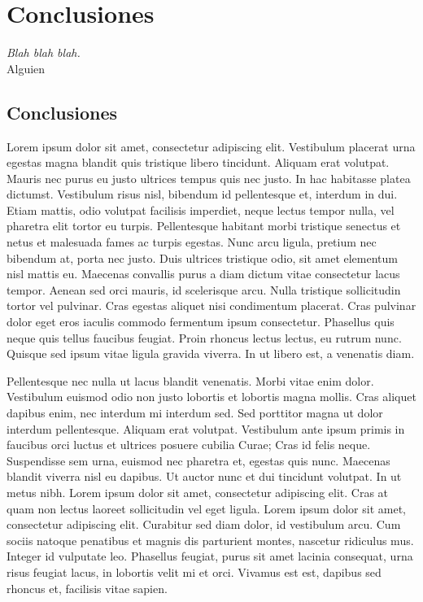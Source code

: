 
\chapter*{Conclusiones} \label{cap7}

\begin{flushright}
\begin{minipage}{7.85cm}
    {\em Blah blah blah.} \\  Alguien
\end{minipage}
\end{flushright}

\vspace*{5mm}

\section*{Conclusiones}

Lorem ipsum dolor sit amet, consectetur adipiscing elit. Vestibulum placerat
urna egestas magna blandit quis tristique libero tincidunt. Aliquam erat
volutpat. Mauris nec purus eu justo ultrices tempus quis nec justo. In hac
habitasse platea dictumst. Vestibulum risus nisl, bibendum id pellentesque et,
interdum in dui. Etiam mattis, odio volutpat facilisis imperdiet, neque lectus
tempor nulla, vel pharetra elit tortor eu turpis. Pellentesque habitant morbi
tristique senectus et netus et malesuada fames ac turpis egestas. Nunc arcu
ligula, pretium nec bibendum at, porta nec justo. Duis ultrices tristique odio,
sit amet elementum nisl mattis eu. Maecenas convallis purus a diam dictum vitae
consectetur lacus tempor. Aenean sed orci mauris, id scelerisque arcu. Nulla
tristique sollicitudin tortor vel pulvinar. Cras egestas aliquet nisi
condimentum placerat. Cras pulvinar dolor eget eros iaculis commodo fermentum
ipsum consectetur. Phasellus quis neque quis tellus faucibus feugiat. Proin
rhoncus lectus lectus, eu rutrum nunc. Quisque sed ipsum vitae ligula gravida
viverra. In ut libero est, a venenatis diam.

Pellentesque nec nulla ut lacus blandit venenatis. Morbi vitae enim dolor.
Vestibulum euismod odio non justo lobortis et lobortis magna mollis. Cras
aliquet dapibus enim, nec interdum mi interdum sed. Sed porttitor magna ut dolor
interdum pellentesque. Aliquam erat volutpat. Vestibulum ante ipsum primis in
faucibus orci luctus et ultrices posuere cubilia Curae; Cras id felis neque.
Suspendisse sem urna, euismod nec pharetra et, egestas quis nunc. Maecenas
blandit viverra nisl eu dapibus. Ut auctor nunc et dui tincidunt volutpat. In ut
metus nibh. Lorem ipsum dolor sit amet, consectetur adipiscing elit. Cras at
quam non lectus laoreet sollicitudin vel eget ligula. Lorem ipsum dolor sit
amet, consectetur adipiscing elit. Curabitur sed diam dolor, id vestibulum arcu.
Cum sociis natoque penatibus et magnis dis parturient montes, nascetur ridiculus
mus. Integer id vulputate leo. Phasellus feugiat, purus sit amet lacinia
consequat, urna risus feugiat lacus, in lobortis velit mi et orci. Vivamus est
est, dapibus sed rhoncus et, facilisis vitae sapien.

